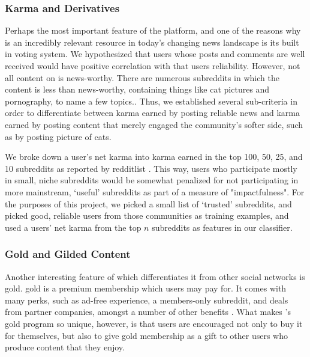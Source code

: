 \subsubsection{\reddit{} Karma and Derivatives} %
\label{ssub:reddit_karma_and_derivatives}

Perhaps the most important feature of the \reddit{} platform, and one of the
reasons why \reddit{} is an incredibly relevant resource in today's changing
news landscape is its built in voting system. We hypothesized that users whose
posts and comments are well received would have positive correlation with that
users reliability. However, not all content on \reddit{} is news-worthy. There
are numerous subreddits in which the content is less than news-worthy,
containing things like cat pictures and pornography, to name a few topics.. Thus,
we established several sub-criteria in order to differentiate between karma
earned by posting reliable news and karma earned by posting content that merely
engaged the community's softer side, such as by posting picture of cats.

We broke down a user's net karma into karma earned in the top 100, 50, 25, and
10 subreddits as reported by redditlist \cite{redditlist}. This way, users who
participate mostly in small, niche subreddits would be somewhat penalized for
not participating in more mainstream, `useful' subreddits as part of a measure
of "impactfulness". For the purposes of this project, we picked a small list of
`trusted' subreddits, and picked good, reliable users from those communities as
training examples, and used a users' net karma from the top $n$ subreddits as
features in our classifier.

\subsubsection{\reddit{} Gold and Gilded Content} %
\label{ssub:reddit_gold_and_gilded_content}

Another interesting feature of \reddit{} which differentiates it from other
social networks is \reddit{} gold. \reddit{} gold is a premium membership which
users may pay for. It comes with many perks, such as ad-free experience, a
members-only subreddit, and deals from partner companies, amongst a number of
other benefits \cite{redditgold}. What makes \reddit{}'s gold program so unique,
however, is that users are encouraged not only to buy it for themselves, but
also to give \reddit{} gold membership as a gift to other users who produce
content that they enjoy.

